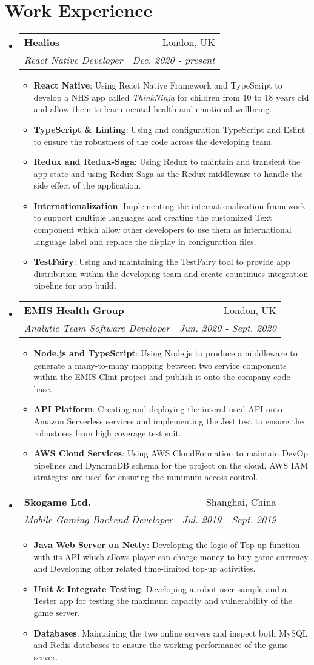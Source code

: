 \documentclass[letterpaper,11pt]{article}
\makeatletter
\newcommand{\resumeItem}[2]{
  \item\small{
    \textbf{#1}{: #2 \vspace{-2pt}}
  }
}
\newcommand{\resumeSubheading}[4]{
  \vspace{-1pt}\item
    \begin{tabular*}{0.97\textwidth}[t]{l@{\extracolsep{\fill}}r}
      \textbf{#1} & #2 \\
      \textit{\small#3} & \textit{\small #4} \\
    \end{tabular*}\vspace{-5pt}
}
\newcommand{\resumeSubHeadingListStart}{\begin{itemize}[leftmargin=*]}
\newcommand{\resumeSubHeadingListEnd}{\end{itemize}}
\newcommand{\resumeItemListStart}{\begin{itemize}}
\newcommand{\resumeItemListEnd}{\end{itemize}\vspace{-5pt}}
\makeatother
\begin{document}
\section{Work Experience}
  \resumeSubHeadingListStart
  \resumeSubheading
  {Healios}{London, UK}
  {React Native Developer}{Dec. 2020 - present}
  \resumeItemListStart
    \resumeItem{React Native}
      {Using React Native Framework and TypeScript to develop a NHS app called \textit{ThinkNinja} for children from 10 to 18 years old
      and allow them to learn mental health and emotional wellbeing.}
    \resumeItem{TypeScript \& Linting}
      {Using and configuration TypeScript and Eslint to ensure the robustness of the code across the developing team.}
    \resumeItem{Redux and Redux-Saga}
      {Using Redux to maintain and transient the app state and using Redux-Saga as the Redux middleware to handle the side effect of the application.}
    \resumeItem{Internationalization}
      {Implementing the internationalization framework to support multiple languages and creating the customized Text component
      which allow other developers to use them as international language label and replace the display in configuration files.}
    \resumeItem{TestFairy}
      {Using and maintaining the TestFairy tool to provide app distribution within the developing team and create countinues integration pipeline for app build.}
  \resumeItemListEnd

  \resumeSubheading
  {EMIS Health Group}{London, UK}
  {Analytic Team Software Developer}{Jun. 2020 - Sept. 2020}
  \resumeItemListStart
    \resumeItem{Node.js and TypeScript}
      {Using Node.js to produce a middleware to generate a many-to-many mapping between two service components within the EMIS Clint
      project and publish it onto the company code base.}
    \resumeItem{API Platform}
      {Creating and deploying the interal-used API onto Amazon Serverless services and implementing the Jest test to ensure the robustness from high coverage test suit.}
    \resumeItem{AWS Cloud Services}
      {Using AWS CloudFormation to maintain DevOp pipelines and DynamoDB schema for the project on the cloud, AWS IAM strategies are used 
      for ensuring the minimum access control.}
  \resumeItemListEnd

    \resumeSubheading
      {Skogame Ltd.}{Shanghai, China}
      {Mobile Gaming Backend Developer}{Jul. 2019 - Sept. 2019}
      \resumeItemListStart
        \resumeItem{Java Web Server on Netty}
            {Developing the logic of Top-up function with its API which allows player can charge money to buy game currency
            and Developing other related time-limited top-up activities.}
        \resumeItem{Unit \& Integrate Testing}
            {Developing a robot-user sample and a Tester app for testing the maximum capacity
            and vulnerability of the game server.}
        \resumeItem{Databases}
            {Maintaining the two online servers and inspect both MySQL and Redis databases to ensure the working
            performance of the game server.}
      \resumeItemListEnd
  \resumeSubHeadingListEnd
\end{document}
